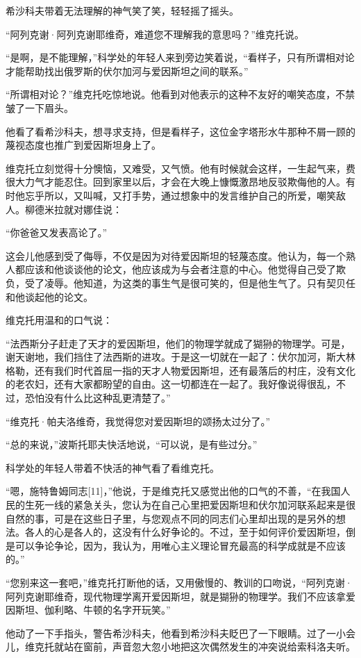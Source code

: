 希沙科夫带着无法理解的神气笑了笑，轻轻摇了摇头。

“阿列克谢·阿列克谢耶维奇，难道您不理解我的意思吗？”维克托说。

“是啊，是不能理解，”科学处的年轻人来到旁边笑着说，“看样子，只有所谓相对论才能帮助找出俄罗斯的伏尔加河与爱因斯坦之间的联系。”

“所谓相对论？”维克托吃惊地说。他看到对他表示的这种不友好的嘲笑态度，不禁皱了一下眉头。

他看了看希沙科夫，想寻求支持，但是看样子，这位金字塔形水牛那种不屑一顾的蔑视态度也推广到爱因斯坦身上了。

维克托立刻觉得十分懊恼，又难受，又气愤。他有时候就会这样，一生起气来，费很大力气才能忍住。回到家里以后，才会在大晚上慷慨激昂地反驳欺侮他的人。有时他忘乎所以，又叫喊，又打手势，通过想象中的发言维护自己的所爱，嘲笑敌人。柳德米拉就对娜佳说：

“你爸爸又发表高论了。”

这会儿他感到受了侮辱，不仅是因为对待爱因斯坦的轻蔑态度。他认为，每一个熟人都应该和他谈谈他的论文，他应该成为与会者注意的中心。他觉得自己受了欺负，受了凌辱。他知道，为这类的事生气是很可笑的，但是他生气了。只有契贝任和他谈起他的论文。

维克托用温和的口气说：

“法西斯分子赶走了天才的爱因斯坦，他们的物理学就成了猢狲的物理学。可是，谢天谢地，我们挡住了法西斯的进攻。于是这一切就在一起了：伏尔加河，斯大林格勒，还有我们时代首屈一指的天才人物爱因斯坦，还有最落后的村庄，没有文化的老农妇，还有大家都盼望的自由。这一切都连在一起了。我好像说得很乱，不过，恐怕没有什么比这种乱更清楚了。”

“维克托·帕夫洛维奇，我觉得您对爱因斯坦的颂扬太过分了。”

“总的来说，”波斯托耶夫快活地说，“可以说，是有些过分。”

科学处的年轻人带着不快活的神气看了看维克托。

“嗯，施特鲁姆同志[11]，”他说，于是维克托又感觉出他的口气的不善，“在我国人民的生死一线的紧急关头，您认为在自己心里把爱因斯坦和伏尔加河联系起来是很自然的事，可是在这些日子里，与您观点不同的同志们心里却出现的是另外的想法。各人的心是各人的，这没有什么好争论的。不过，至于如何评价爱因斯坦，倒是可以争论争论，因为，我认为，用唯心主义理论冒充最高的科学成就是不应该的。”

“您别来这一套吧，”维克托打断他的话，又用傲慢的、教训的口吻说，“阿列克谢·阿列克谢耶维奇，现代物理学离开爱因斯坦，就是猢狲的物理学。我们不应该拿爱因斯坦、伽利略、牛顿的名字开玩笑。”

他动了一下手指头，警告希沙科夫，他看到希沙科夫眨巴了一下眼睛。过了一小会儿，维克托就站在窗前，声音忽大忽小地把这次偶然发生的冲突说给索科洛夫听。


